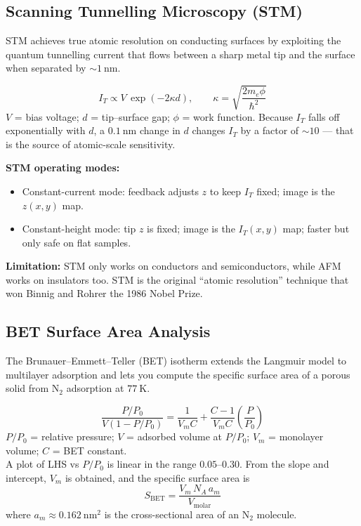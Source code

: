 \documentclass[12pt,a4paper]{article}
\begin{document}
\subsection{Scanning Tunnelling Microscopy (STM)}
STM achieves true atomic resolution on conducting surfaces by exploiting the quantum tunnelling current that flows between a sharp metal tip and the surface when separated by $\sim 1\ \mathrm{nm}$.

\begin{tcolorbox}[formulabox, title={Tunnelling Current in STM}]
\[
I_{T} \propto V\,\exp(-2\kappa d), \qquad \kappa=\sqrt{\frac{2m_e\phi}{\hbar^{2}}}
\]
$V$ = bias voltage; $d$ = tip--surface gap; $\phi$ = work function. Because $I_T$ falls off exponentially with $d$, a $0.1\ \mathrm{nm}$ change in $d$ changes $I_T$ by a factor of $\sim 10$ — that is the source of atomic-scale sensitivity.
\end{tcolorbox}

\textbf{STM operating modes:}
\begin{itemize}[leftmargin=*, itemsep=1pt, topsep=2pt]
  \item Constant-current mode: feedback adjusts $z$ to keep $I_T$ fixed; image is the $z(x,y)$ map.
  \item Constant-height mode: tip $z$ is fixed; image is the $I_T(x,y)$ map; faster but only safe on flat samples.
\end{itemize}

\textbf{Limitation:} STM only works on conductors and semiconductors, while AFM works on insulators too. STM is the original ``atomic resolution'' technique that won Binnig and Rohrer the 1986 Nobel Prize.

\subsection{BET Surface Area Analysis}
The Brunauer--Emmett--Teller (BET) isotherm extends the Langmuir model to multilayer adsorption and lets you compute the specific surface area of a porous solid from $\mathrm{N_2}$ adsorption at $77\ \mathrm{K}$.

\begin{tcolorbox}[formulabox, title={BET Equation}]
\[
\frac{P/P_0}{V(1-P/P_0)} = \frac{1}{V_m C} + \frac{C-1}{V_m C}\!\left(\frac{P}{P_0}\right)
\]
$P/P_0$ = relative pressure; $V$ = adsorbed volume at $P/P_0$; $V_m$ = monolayer volume; $C$ = BET constant.\\
A plot of LHS vs $P/P_0$ is linear in the range $0.05$--$0.30$. From the slope and intercept, $V_m$ is obtained, and the specific surface area is
\[
S_{\mathrm{BET}} = \frac{V_m\,N_A\,a_m}{V_{\mathrm{molar}}}
\]
where $a_m\approx 0.162\ \mathrm{nm^{2}}$ is the cross-sectional area of an $\mathrm{N_2}$ molecule.
\end{tcolorbox}
\end{document}
